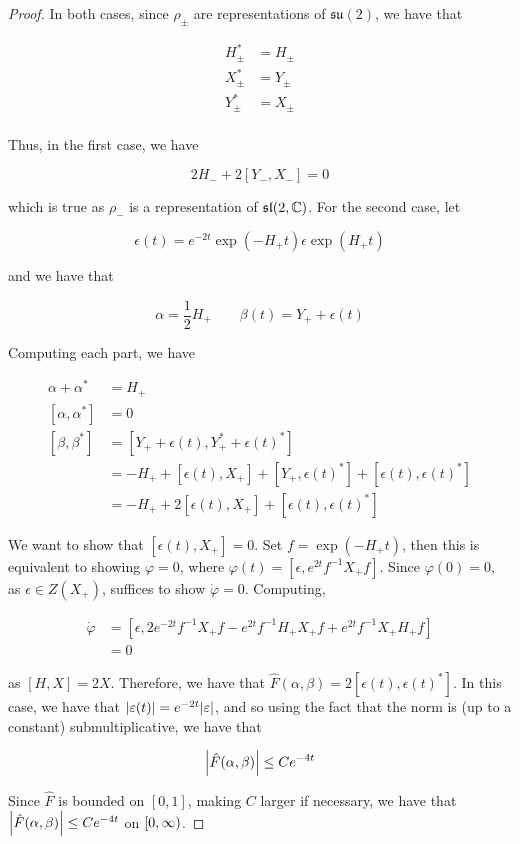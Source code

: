 \documentclass{article}
\newcommand{\su}{\mathfrak{su}}
\renewcommand{\sl}{\mathfrak{sl}}
\begin{document}
\begin{proof}
    In both cases, since \(\rho_{\pm}\) are representations of \(\su(2)\), we have that

    \begin{align*}
        H_{\pm}^* &= H_{\pm} \\
        X_{\pm}^* &= Y_{\pm} \\
        Y_{\pm}^* &= X_{\pm} \\
    \end{align*}

    Thus, in the first case, we have

    \[2H_- + 2[Y_-, X_-] = 0\]

    which is true as \(\rho_-\) is a representation of \(\sl(2, \C)\). For the second case, let

    \[\epsilon(t) = e^{-2t}\exp(-H_+t)\epsilon\exp(H_+t)\]

    and we have that

    \[\alpha = \frac12H_+ \qquad \beta(t) = Y_+ + \epsilon(t)\]

    Computing each part, we have

    \begin{align*}
        \alpha + \alpha^* &= H_+ \\
        [\alpha, \alpha^*] &= 0 \\
        [\beta, \beta^*] &= [Y_+ + \epsilon(t), Y_+^* + \epsilon(t)^*] \\
        &= -H_+ + [\epsilon(t), X_+] + [Y_+, \epsilon(t)^*] + [\epsilon(t), \epsilon(t)^*] \\
        &= -H_+ + 2[\epsilon(t), X_+] + [\epsilon(t), \epsilon(t)^*]
    \end{align*}

    We want to show that \([\epsilon(t), X_+] = 0\). Set \(f = \exp(-H_+t)\), then this is equivalent to showing \(\varphi = 0\), where \(\varphi(t) = [\epsilon, e^{2t}f^{-1}X_+ f]\). Since \(\varphi(0) = 0\), as \(\epsilon \in Z(X_+)\), suffices to show \(\dot\varphi = 0\). Computing,

    \begin{align*}
        \dot\varphi &= [\epsilon, 2e^{-2t}f^{-1}X_+ f - e^{2t}f^{-1}H_+X_+ f + e^{2t}f^{-1}X_+ H_+f] \\
        &= 0
    \end{align*}

    as \([H, X] = 2X\). Therefore, we have that \(\hat F(\alpha, \beta) = 2[\epsilon(t), \epsilon(t)^*]\). In this case, we have that \(\abs{\varepsilon(t)} = e^{-2t}\abs{\varepsilon}\), and so using the fact that the norm is (up to a constant) submultiplicative, we have that

    \[\abs{\hat F(\alpha, \beta)} \le Ce^{-4t}\]

    Since \(\hat F\) is bounded on \([0, 1]\), making \(C\) larger if necessary, we have that \(\abs{\hat F(\alpha, \beta)} \le Ce^{-4t}\) on \([0, \infty)\). 
\end{proof}
\end{document}
